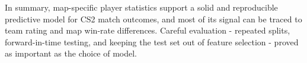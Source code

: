 \documentclass[11pt]{article}
\begin{document}
In summary, map-specific player statistics support a solid and reproducible predictive model for CS2 match outcomes, and most of its signal can be traced to team rating and map win-rate differences. Careful evaluation - repeated splits, forward-in-time testing, and keeping the test set out of feature selection - proved as important as the choice of model.





\end{document}
